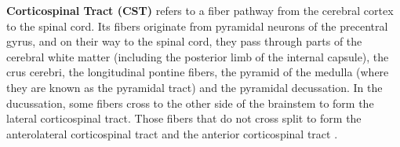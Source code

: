 \documentclass[../structure.tex]{subfiles}
\begin{document}
	\begin{comment}
Cingulum receives afferent fibers from the parts of the thalamus that are associated with the spinothalamic tract. This, in addition to the fact that the cingulum is a central structure in learning to correct mistakes, indicates that the cingulum is involved in appraisal of pain and reinforcement of behavior that reduces it \cite{Brodal2016}.
The cingulum is described from various brain images as a C shaped structure within the brain that wraps around the frontal lobe to the temporal lobe right above the corpus callosum. It is located beneath the cingulate gyrus within the medial surface of the brain therefore encircling the entire brain. There are two primary parts of the cingulate cortex, as is typical with most brain structures. There is the posterior cingulate and anterior cingulate. The anterior is linked to emotion, especially apathy and depression. Here function and structure changes are related meaning any change within this structure would lead to a function change, particularly behavioral because of its function involving emotions. Damage to this area can have various effects on mental disorders and mental health. The posterior section is more related to cognitive functions. This can include attention, visual and spatial skills, working memory and general memory. Because of its location, the cingulum is very important to brain structure connectivity and the integration of information that it receives \cite{JaredTanner2010}.
	\end{comment}
	\textbf{Corticospinal Tract (CST)}
		refers to a fiber pathway from the cerebral cortex to the spinal cord. Its fibers originate from pyramidal neurons of the precentral gyrus, and on their way to the spinal cord, they pass through parts of the cerebral white matter (including the posterior limb of the internal capsule), the crus cerebri, the longitudinal pontine fibers, the pyramid of the medulla (where they are known as the pyramidal tract) and the pyramidal decussation. In the ducussation, some fibers cross to the other side of the brainstem to form the lateral corticospinal tract. Those fibers that do not cross split to form the anterolateral corticospinal tract and the anterior corticospinal tract \cite{Washington1994}.
		
\end{document}
